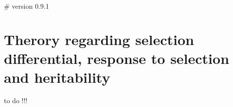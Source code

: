 # version 0.9.1
\section{Therory regarding selection differential, response to selection and heritability}
\label{text_SandR}


to do !!!

